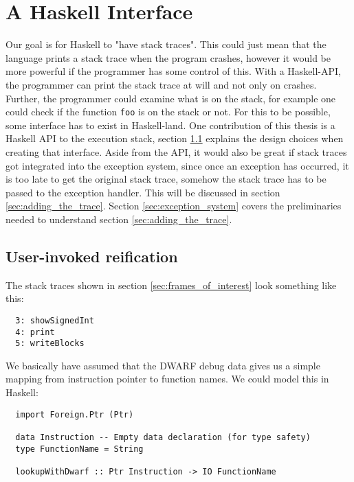 \chapter{A Haskell Interface} \label{chp:a_haskell_interface}

Our goal is for Haskell to "have stack traces". This could just mean
that the language prints a stack trace when the program crashes, however
it would be more powerful if the programmer has some control of this.
With a Haskell-API, the programmer can print the stack trace at
will and not only on crashes. Further, the programmer could examine
what is on the stack, for example one could check
if the function \texttt{foo} is on the stack or not. For this to be
possible, some interface has to exist in Haskell-land. One contribution
of this thesis is a Haskell API to the execution stack, section
\ref{sec:user-invoked_reification} explains the design choices when
creating that interface. Aside from the API, it would also be great if
stack traces got integrated into the exception system, since once
an exception has occurred, it is too late to get the original stack
trace, somehow the stack trace has to be passed to the exception
handler. This will be discussed
in section \ref{sec:adding_the_trace}. Section \ref{sec:exception_system} covers the
preliminaries needed to understand section \ref{sec:adding_the_trace}.

\section{User-invoked reification} \label{sec:user-invoked_reification}

The stack traces shown in section \ref{sec:frames_of_interest} look
something like this:

\begin{verbatim}
  3: showSignedInt
  4: print
  5: writeBlocks
\end{verbatim}

We basically have assumed that the DWARF debug data gives us a simple
mapping from instruction pointer to function names. We could model
this in Haskell:

\begin{verbatim}
  import Foreign.Ptr (Ptr)

  data Instruction -- Empty data declaration (for type safety)
  type FunctionName = String

  lookupWithDwarf :: Ptr Instruction -> IO FunctionName
\end{verbatim}


